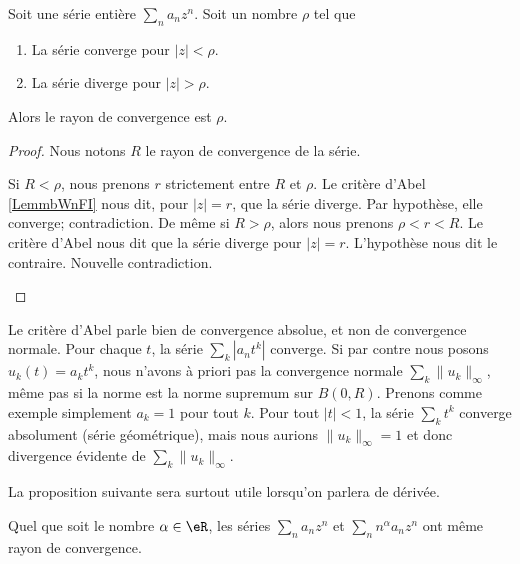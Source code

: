 \begin{corollary}       \label{CORooCUDSooTfMvAB}
	Soit une série entière \( \sum_na_nz^n\). Soit un nombre \( \rho\) tel que
	\begin{enumerate}
		\item
		      La série converge pour \( | z |<\rho\).
		\item
		      La série diverge pour \( | z |>\rho\).
	\end{enumerate}
	Alors le rayon de convergence est \( \rho\).
\end{corollary}

\begin{proof}
	Nous notons \( R\) le rayon de convergence de la série.
	\begin{subproof}
		Si \( R<\rho\), nous prenons \( r\) strictement entre \( R\) et \( \rho\). Le critère d'Abel \ref{LemmbWnFI} nous dit, pour \( | z |=r\), que la série diverge. Par hypothèse, elle converge; contradiction.
		De même si \( R>\rho\), alors nous prenons \( \rho<r<R\). Le critère d'Abel nous dit que la série diverge pour \( | z |=r\). L'hypothèse nous dit le contraire. Nouvelle contradiction.
	\end{subproof}
\end{proof}

Le critère d'Abel parle bien de convergence absolue, et non de convergence normale. Pour chaque \( t\), la série \( \sum_k | a_nt^k |\) converge. Si par contre nous posons \( u_k(t)=a_kt^k\), nous n'avons à priori pas la convergence normale \( \sum_k\| u_k \|_{\infty}\), même pas si la norme est la norme supremum sur \( B(0,R)\). Prenons comme exemple simplement \( a_k=1\) pour tout \( k\). Pour tout \( | t |<1\), la série \( \sum_k t^k\) converge absolument (série géométrique), mais nous aurions \( \| u_k \|_{\infty}=1\) et donc divergence évidente de \( \sum_k\| u_k \|_{\infty}\).

La proposition suivante sera surtout utile lorsqu'on parlera de dérivée.
\begin{proposition}        \label{PropHDIUooKTbVSX}
	Quel que soit le nombre \( \alpha\in \eR\), les séries \( \sum_na_nz^n\) et \( \sum_nn^{\alpha}a_nz^n\) ont même rayon de convergence.
\end{proposition}

